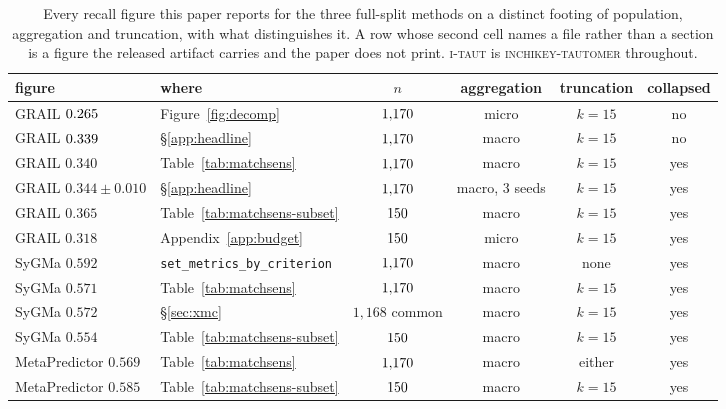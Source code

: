 \begin{table}[h]
\caption{Every recall figure this paper reports for the three full-split methods on a distinct
footing of population, aggregation and truncation, with what
distinguishes it. A row whose second cell names a file rather than a section is a figure the
released artifact carries and the paper does not print. \textsc{i-taut} is \textsc{inchikey-tautomer} throughout.}
\label{tab:provenance}
\begin{center}
\footnotesize\setlength{\tabcolsep}{4pt}
\begin{tabular}{>{\raggedright\arraybackslash}p{}lcccc}
\toprule
figure & where & $n$ & aggregation & truncation & collapsed \\
\midrule
GRAIL $0.265$          & Figure~\ref{fig:decomp} & $1{,}170$ & micro & $k{=}15$ & no \\
GRAIL $0.339$        & \S\ref{app:headline}  & $1{,}170$ & macro & $k{=}15$ & no \\
GRAIL $0.340$              & Table~\ref{tab:matchsens} & $1{,}170$ & macro & $k{=}15$ & yes \\
GRAIL $0.344\pm0.010$      & \S\ref{app:headline}  & $1{,}170$ & macro, 3 seeds & $k{=}15$ & yes \\
GRAIL $0.365$              & Table~\ref{tab:matchsens-subset} & $150$ & macro & $k{=}15$ & yes \\
GRAIL $0.318$              & Appendix~\ref{app:budget} & $150$ & micro & $k{=}15$ & yes \\
\midrule
SyGMa $0.592$              & \texttt{set\_metrics\_by\_criterion} & $1{,}170$ & macro & none & yes \\
SyGMa $0.571$              & Table~\ref{tab:matchsens} & $1{,}170$ & macro & $k{=}15$ & yes \\
SyGMa $0.572$              & \S\ref{sec:xmc} & $1{,}168$ common & macro & $k{=}15$ & yes \\
SyGMa $0.554$              & Table~\ref{tab:matchsens-subset} & $150$ & macro & $k{=}15$ & yes \\
\midrule
MetaPredictor $0.569$      & Table~\ref{tab:matchsens} & $1{,}170$ & macro & either & yes \\
MetaPredictor $0.585$      & Table~\ref{tab:matchsens-subset} & $150$ & macro & $k{=}15$ & yes \\
\bottomrule
\end{tabular}
\end{center}
\end{table}

